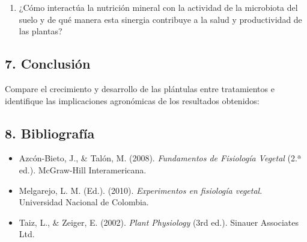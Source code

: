 \documentclass[
  spanish,
  10pt,
  letterpaper,
  twocolumn]{article}
\providecommand{\tightlist}{%
  \setlength{\itemsep}{0pt}\setlength{\parskip}{0pt}}
\begin{document}
\hrulefill

\hrulefill

\hrulefill

\hrulefill

\begin{enumerate}
\def\labelenumi{\arabic{enumi}.}
\setcounter{enumi}{2}
\tightlist
\item
  ¿Cómo interactúa la nutrición mineral con la actividad de la
  microbiota del suelo y de qué manera esta sinergia contribuye a la
  salud y productividad de las plantas?
\end{enumerate}

\hrulefill

\hrulefill

\hrulefill

\hrulefill

\subsection{7. Conclusión}\label{conclusiuxf3n}

Compare el crecimiento y desarrollo de las plántulas entre tratamientos
e identifique las implicaciones agronómicas de los resultados obtenidos:

\hrulefill

\hrulefill

\hrulefill

\hrulefill

\subsection{8. Bibliografía}\label{bibliografuxeda}

\begin{itemize}
\item
  Azcón-Bieto, J., \& Talón, M. (2008). \emph{Fundamentos de Fisiología
  Vegetal} (2.ª ed.). McGraw-Hill Interamericana.
\item
  Melgarejo, L. M. (Ed.). (2010). \emph{Experimentos en fisiología
  vegetal}. Universidad Nacional de Colombia.
\item
  Taiz, L., \& Zeiger, E. (2002). \emph{Plant Physiology} (3rd ed.).
  Sinauer Associates Ltd.
\end{itemize}
\end{document}
